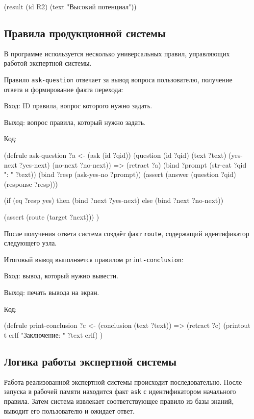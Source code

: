\documentclass[14pt,a4paper]{extarticle}
\begin{document}
\begin{Code}
(result (id R2) (text "Высокий потенциал"))
\end{Code}

\subsection{Правила продукционной системы}

В программе используется несколько универсальных правил, управляющих работой экспертной системы.

Правило \texttt{ask-question} отвечает за вывод вопроса пользователю, получение ответа и формирование факта перехода:

Вход: ID правила, вопрос которого нужно задать.

Выход: вопрос правила, который нужно задать.

Код:

\begin{Code}
(defrule ask-question
  ?a <- (ask (id ?qid))
  (question (id ?qid) (text ?text) 
            (yes-next ?yes-next) 
            (no-next ?no-next))
  =>
  (retract ?a)
  (bind ?prompt (str-cat ?qid ": " ?text))
  (bind ?resp (ask-yes-no ?prompt))
  (assert (answer (question ?qid) (response ?resp)))

  (if (eq ?resp yes)
    then
    (bind ?next ?yes-next)
    else
    (bind ?next ?no-next))

  (assert (route (target ?next)))
)
\end{Code}

После получения ответа система создаёт факт \texttt{route}, содержащий идентификатор следующего узла. 

Итоговый вывод выполняется правилом \texttt{print-conclusion}:

Вход: вывод, который нужно вывести.

Выход: печать вывода на экран.

Код: 

\begin{Code}
(defrule print-conclusion
  ?c <- (conclusion (text ?text))
  =>
  (retract ?c)
  (printout t crlf "Заключение: " ?text crlf)
)
\end{Code}

\subsection{Логика работы экспертной системы}

Работа реализованной экспертной системы происходит последовательно. После запуска в рабочей памяти находится факт \texttt{ask} с идентификатором начального правила. Затем система извлекает соответствующее правило из базы знаний, выводит его пользователю и ожидает ответ.
\end{document}
